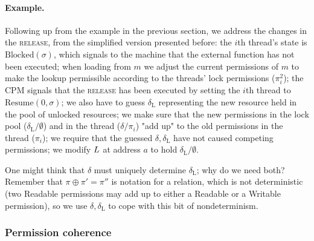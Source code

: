 \paragraph{Example.} Following up from the example in the previous section, 
we address the changes in the \textsc{release}, from the simplified version 
presented before: 
the $i$th thread's state is $\mathrm{Blocked}(\sigma)$, 
which signals to the machine that the external function has not been executed;
when loading from $m$ we adjust the current permissions of 
$m$ to make the lookup permissible according to the threads' lock permissions ($\pi_i^2$);
the CPM signals that the \textsc{release} has been executed by setting the $i$th thread to
$\mathrm{Resume}(0,\sigma)$;
we also have to guess $\delta_\mathrm{L}$ representing
the new resource held in the pool of unlocked resources;
we make sure that the new permissions in the lock pool ($\delta_\mathrm{L}/\emptyset$) and in the thread ($\delta/\pi_i$)
"add up" to the old permissions in the thread ($\pi_i$);
we require that the guessed $\delta,\delta_\mathrm{L}$ have
not caused competing permissions;
we modify $L$ at address $a$
to hold $\delta_\mathrm{L}/\emptyset$.

One might think that $\delta$ must uniquely determine $\delta_\mathrm{L}$;
why do we need both?  Remember that $\pi\oplus\pi'=\pi''$ is notation for a relation,
which is not deterministic (two Readable
permissions may add up to either a Readable or a Writable permission),
so we use $\delta,\delta_\mathrm{L}$ to cope with this bit of
nondeterminism.\\
\subsubsection{Permission coherence}

